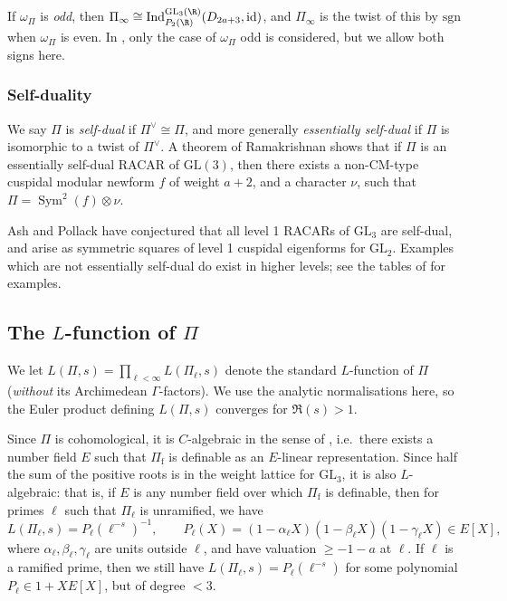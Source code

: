 \documentclass[10pt,reqno,a4paper]{amsart}
\newcommand{\Pif}{\Pi\subf}
\newcommand{\subf}{_{\mathrm{f}}}
\newcommand{\GL}{\mathrm{GL}}
\begin{document}
\begin{remark}
If $\omega_{\Pi}$ is \emph{odd}, then $\Pi_\infty \cong \mathrm{Ind}_{P_2(\R)}^{\GL_3(\R)} (D_{2a+3}, \mathrm{id})$, and $\Pi_\infty$ is the twist of this by $\mathrm{sgn}$ when $\omega_{\Pi}$ is even. In \cite{Mah00}, only the case of $\omega_{\Pi}$ odd is considered, but we allow both signs here.
\end{remark}


\subsubsection{Self-duality}

We say $\Pi$ is \emph{self-dual} if $\Pi^\vee \cong \Pi$, and more generally \emph{essentially self-dual} if $\Pi$ is isomorphic to a twist of $\Pi^\vee$. A theorem of Ramakrishnan \cite{Ram14} shows that if $\Pi$ is an essentially self-dual RACAR of $\GL(3)$, then there exists a non-CM-type cuspidal modular newform $f$ of weight $a + 2$, and a character $\nu$, such that $\Pi = \operatorname{Sym}^2(f) \otimes \nu$.

\begin{remark}
Ash and Pollack have conjectured \cite{AP08} that all level 1 RACARs of $\GL_3$ are self-dual, and arise as symmetric squares of level 1 cuspidal eigenforms for $\GL_2$. Examples which are not essentially self-dual do exist in higher levels; see the tables of \cite{GKTV97} for examples.
\end{remark}


\subsection{\texorpdfstring{The $L$-function of $\Pi$}{The L-function of Pi}}
\label{sec:L-function}

We let $L(\Pi, s) = \prod_{\ell < \infty} L(\Pi_\ell, s)$ denote the standard $L$-function of $\Pi$ (\emph{without} its Archimedean $\Gamma$-factors). We use the analytic normalisations here, so the Euler product defining $L(\Pi, s)$ converges for $\Re(s) > 1$.

Since $\Pi$ is cohomological, it is $C$-algebraic in the sense of \cite{BG14}, i.e.~there exists a number field $E$ such that $\Pif$ is definable as an $E$-linear representation. Since half the sum of the positive roots is in the weight lattice for $\GL_3$, it is also $L$-algebraic: that is, if $E$ is any number field over which $\Pif$ is definable, then for primes $\ell$ such that $\Pi_\ell$ is unramified, we have
\[
L(\Pi_\ell, s) = P_\ell\left(\ell^{-s}\right)^{-1}, \qquad P_\ell(X) = (1 - \alpha_\ell X)(1 - \beta_\ell X)(1 - \gamma_\ell X) \in E[X],
\]
where $\alpha_\ell, \beta_\ell, \gamma_\ell$ are units outside $\ell$, and have valuation $\ge -1-a$ at $\ell$. If $\ell$ is a ramified prime, then we still have $L(\Pi_\ell, s) = P_\ell(\ell^{-s})$ for some polynomial $P_\ell \in 1 + X E[X]$, but of degree $< 3$.
\end{document}
